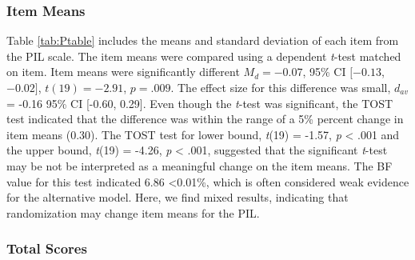 \documentclass[english,man, mask]{apa6}
\theoremstyle{definition}
\theoremstyle{definition}
\theoremstyle{definition}
\theoremstyle{remark}
\begin{document}
\subsubsection{Item Means}\label{item-means}

Table \ref{tab:Ptable} includes the means and standard deviation of each
item from the PIL scale. The item means were compared using a dependent
\emph{t}-test matched on item. Item means were significantly different
\(M_d = -0.07\), 95\% CI \([-0.13\), \(-0.02]\), \(t(19) = -2.91\),
\(p = .009\). The effect size for this difference was small, \(d_{av}\)
= -0.16 95\% CI {[}-0.60, 0.29{]}. Even though the \emph{t}-test was
significant, the TOST test indicated that the difference was within the
range of a 5\% percent change in item means (0.30). The TOST test for
lower bound, \emph{t}(19) = -1.57, \emph{p} \textless{} .001 and the
upper bound, \emph{t}(19) = -4.26, \emph{p} \textless{} .001, suggested
that the significant \emph{t}-test may be not be interpreted as a
meaningful change on the item means. The BF value for this test
indicated 6.86 \textless{}0.01\%, which is often considered weak
evidence for the alternative model. Here, we find mixed results,
indicating that randomization may change item means for the PIL.

\subsubsection{Total Scores}\label{total-scores}
\end{document}
